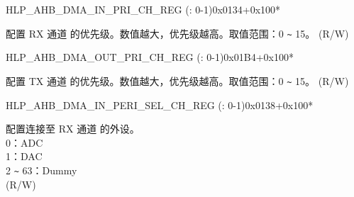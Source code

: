 \begin{register}{H}{LP\_AHB\_DMA\_IN\_PRI\_CH\_REG (: 0-1)}{0x0134+0x100*}\label{regdesc:LPAHBDMAINPRICHNREG}
%
%
\regnewline%
\begin{regdesc}\begin{reglist}
\label{fielddesc:LPAHBDMARXPRICHN}\item [LP\_AHB\_DMA\_RX\_PRI\_CH\regindex{n}] 配置 RX 通道  的优先级。数值越大，优先级越高。取值范围：0 \verb+~+ 15。  (R/W)
\end{reglist}\end{regdesc}
\end{register}


\begin{register}{H}{LP\_AHB\_DMA\_OUT\_PRI\_CH\_REG (: 0-1)}{0x01B4+0x100*}\label{regdesc:LPAHBDMAOUTPRICHNREG}
%
%
\regnewline%
\begin{regdesc}\begin{reglist}
\label{fielddesc:LPAHBDMATXPRICHN}\item [LP\_AHB\_DMA\_TX\_PRI\_CH\regindex{n}] 配置 TX 通道  的优先级。数值越大，优先级越高。取值范围：0 \verb+~+ 15。 (R/W)
\end{reglist}\end{regdesc}
\end{register}


\begin{register}{H}{LP\_AHB\_DMA\_IN\_PERI\_SEL\_CH\_REG (: 0-1)}{0x0138+0x100*}\label{regdesc:LPAHBDMAINPERISELCHNREG}
%
%
\regnewline%
\begin{regdesc}\begin{reglist}
\label{fielddesc:LPAHBDMAPERIINSELCHN}\item [LP\_AHB\_DMA\_PERI\_IN\_SEL\_CH\regindex{n}] 配置连接至 RX 通道  的外设。\\ 0：ADC\\ 1：DAC\\ 2 \verb+~+ 63：Dummy \\ (R/W)
\end{reglist}\end{regdesc}
\end{register}


